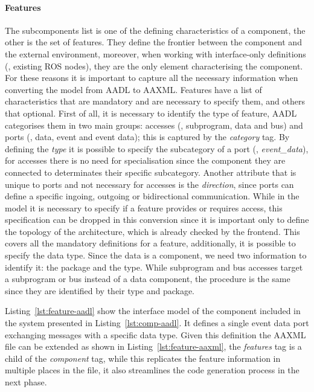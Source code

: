 \paragraph{Features} The subcomponents list is one of the defining characteristics of a component, the other is the set of features. They define the frontier between the component and the external environment, moreover, when working with interface-only definitions (\eg, existing ROS nodes), they are the only element characterising the component. For these reasons it is important to capture all the necessary information when converting the model from AADL to AAXML. Features have a list of characteristics that are mandatory and are necessary to specify them, and others that optional. First of all, it is necessary to identify the type of feature, AADL categorises them in two main groups: accesses (\ie, subprogram, data and bus) and ports (\ie, data, event and event data); this is captured by the \textit{category} tag. By defining the \textit{type} it is possible to specify the subcategory of a port (\eg, \textit{event\_data}), for accesses there is no need for specialisation since the component they are connected to determinates their  specific subcategory. Another attribute that is unique to ports and not necessary for accesses is the \textit{direction}, since ports can define a specific ingoing, outgoing or bidirectional communication. While in the model it is necessary to specify if a feature provides or requires access, this specification can be dropped in this conversion since it is important only to define the topology of the architecture, which is already checked by the frontend. This covers all the mandatory definitions for a feature, additionally, it is possible to specify the data type. Since the data is a component, we need two information to identify it: the package and the type. While subprogram and bus accesses target a subprogram or bus instead of a data component, the procedure is the same since they are identified by their type and package.

Listing~\ref{lst:feature-aadl} show the interface model of the component included in the system presented in Listing~\ref{lst:comp-aadl}. It defines a single event data port exchanging messages with a specific data type. Given this definition the AAXML file can be extended as shown in Listing~\ref{lst:feature-aaxml}, the \textit{features} tag is a child of the \textit{component} tag, while this replicates the feature information in multiple places in the file, it also streamlines the code generation process in the next phase.

